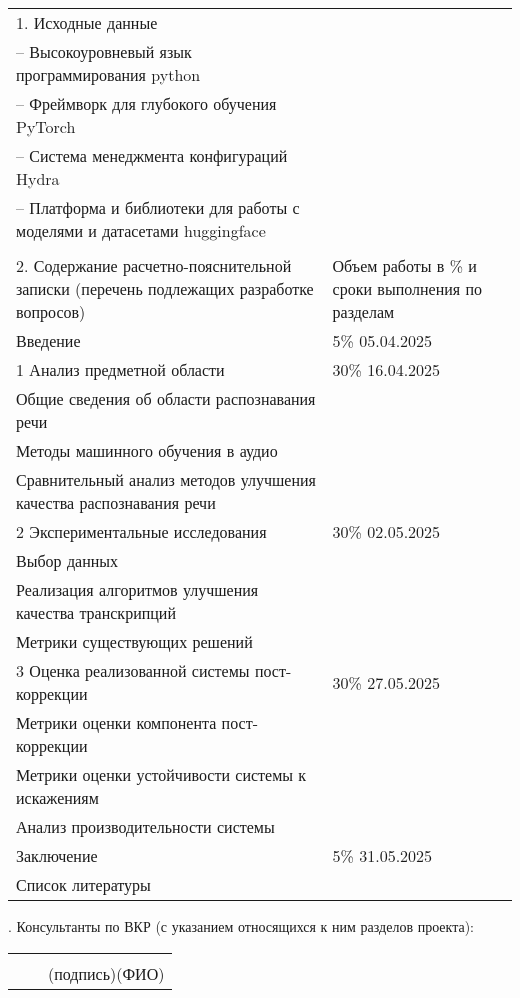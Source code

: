 {\begin{longtable}{p{}|p{}}
1. Исходные данные\\
-- Высокоуровневый язык программирования python \\
-- Фреймворк для глубокого обучения PyTorch \\
-- Система менеджмента конфигураций Hydra \\
-- Платформа и библиотеки для работы с моделями и датасетами huggingface \\
\\
2. Содержание расчетно-пояснительной записки (перечень подлежащих разработке вопросов)
& Объем работы в \% и сроки выполнения по разделам\\
Введение & 5\% \hfill 05.04.2025\\
1 Анализ предметной области & 30\% \hfill 16.04.2025\\
Общие сведения об области распознавания речи\\
Методы машинного обучения в аудио\\
Сравнительный анализ методов улучшения качества распознавания речи \\
2 Экспериментальные исследования & 30\% \hfill 02.05.2025 \\
Выбор данных \\
Реализация алгоритмов улучшения качества транскрипций\\
Метрики существующих решений\\
3 Оценка реализованной системы пост-коррекции & 30\% \hfill 27.05.2025\\
Метрики оценки компонента пост-коррекции\\
Метрики оценки устойчивости системы к искажениям\\
Анализ производительности системы\\
Заключение & 5\% \hfill 31.05.2025\\
Список литературы & \\
\end{longtable}

. Консультанты по ВКР (с указанием относящихся к ним разделов проекта):
\vspace{2em}

\noindent
\begin{tabular}{@{}p{}p{}p{}@{}}
 &  & \hrulefill \hspace{2em}\hrulefill\\
 & & \centering\footnotesize (подпись)\hspace{8em}(ФИО)\\
 

\end{tabular}}
